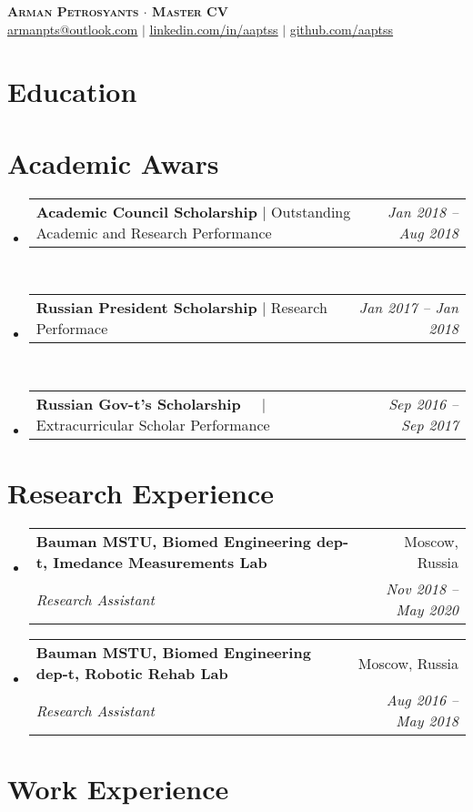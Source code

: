 \documentclass[a4paper,11pt]{article}
\makeatletter
\newcommand{\resumeSubheading}[4]{
  \vspace{-2pt}\item
    \begin{tabular*}{0.97\textwidth}[t]{l@{\extracolsep{\fill}}r}
      \textbf{#1} & #2 \\
      \textit{\small#3} & \textit{\small #4} \\
    \end{tabular*}\vspace{-7pt}
}
\newcommand{\resumeProjectHeading}[2]{
    \item
    \begin{tabular*}{0.97\textwidth}{l@{\extracolsep{\fill}}r}
      \small#1 & #2 \\
    \end{tabular*}\vspace{-7pt}
}
\newcommand{\resumeSubHeadingListStart}{\begin{itemize}[leftmargin=0.15in, label={}]}
\newcommand{\resumeSubHeadingListEnd}{\end{itemize}}
\newcommand{\DesPosition}{\(\cdot\) Master CV}
\makeatother
\begin{document}
\begin{center}
    \textbf{\Huge \scshape Arman Petrosyants \DesPosition } \\ \vspace{1pt}
    \href{mailto:armanpts@outlook.com}{\underline{armanpts@outlook.com}} $|$ 
    \href{https://linkedin.com/in/aaptss}{\underline{linkedin.com/in/aaptss}} $|$
    \href{https://github.com/aaptss}{\underline{github.com/aaptss}}
\end{center}

\section{Education}
  \resumeSubHeadingListStart
	
	
	
  \resumeSubHeadingListEnd

\section{Academic Awars}
    \resumeSubHeadingListStart      
      \resumeProjectHeading
          {\textbf{Academic Council Scholarship} $|$ {Outstanding Academic and Research Performance}}{\emph{Jan 2018 -- Aug 2018}}\\
      \resumeProjectHeading
          {\textbf{Russian President Scholarship} $|$ {Research Performace}}{\emph{Jan 2017 -- Jan 2018}}\\
      \resumeProjectHeading
          {\textbf{Russian Gov-t's Scholarship} $\> \> \> \> \> |$ {Extracurricular Scholar Performance}}{\emph{Sep 2016 -- Sep 2017}}
    \resumeSubHeadingListEnd

\section{Research Experience}
  \resumeSubHeadingListStart
	
    \resumeSubheading
      {Bauman MSTU, Biomed Engineering dep-t, Imedance Measurements Lab}{Moscow, Russia}
      {Research Assistant}{Nov 2018 -- May 2020}
	
	
    \resumeSubheading
      {Bauman MSTU, Biomed Engineering dep-t, Robotic Rehab Lab}{Moscow, Russia}
      {Research Assistant}{Aug 2016 -- May 2018}
	
  	
  \resumeSubHeadingListEnd

\section{Work Experience}
  \resumeSubHeadingListStart
%	
 	 
%	
 	 
  \resumeSubHeadingListEnd
\end{document}
